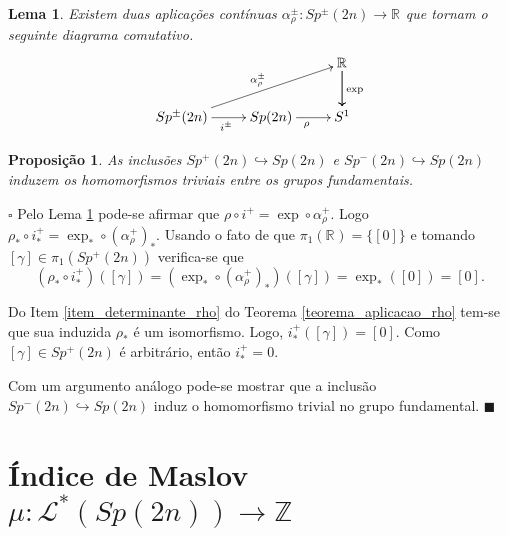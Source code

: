 \documentclass[12pt]{book}
\newtheorem{lema}[teorema]{Lema}
\newtheorem{proposicao}[teorema]{Proposição}
\newenvironment{prova}[1]{$\square$ #1}{\hfill$\blacksquare$}
\newcommand{\caminhos}{\mathcal{L}}
\newcommand{\classe}[1]{[#1]}
\newcommand{\dominioMaslov}{\caminhos^{*}(\gruposimpletico{2n})}
\newcommand{\grupofundamental}[1]{\pi_{1}(#1)}
\newcommand{\gruposimpletico}[1]{Sp(#1)}
\newcommand{\gruposimpleticonaodegenerado}[1]{Sp^{#1}(2n)}
\newcommand{\inteiros}{\mathbb{Z}}
\newcommand{\real}[1]{\mathbb{R}^{#1}}
\newcommand{\reta}{\real{}}
\begin{document}
	\begin{lema}\label{lema_levantamento_rho}
		Existem duas aplicações contínuas $\alpha^{\pm}_{\rho}: \gruposimpleticonaodegenerado{\pm}\to \reta$ que tornam o seguinte diagrama comutativo.
		$$
		\xymatrix{
			& & \real{}\ar[d]\ar[d]^{\text{exp}}
			\\
			\gruposimpleticonaodegenerado{\pm}\ar[urr]^{\alpha^{\pm}_{\rho}} \ar[r]_{i^{\pm}} & \gruposimpletico{2n} \ar[r]_{\rho} & S^{1}
		}
		$$	
		
	\end{lema}
	
	\begin{proposicao}\label{proposicao_homomorfismo_trivial_grupos_simpletico}
		As inclusões $\gruposimpleticonaodegenerado{+} \hookrightarrow \gruposimpletico{2n}$ e $\gruposimpleticonaodegenerado{-} \hookrightarrow \gruposimpletico{2n}$ induzem os homomorfismos triviais entre os grupos fundamentais.
	\end{proposicao}
	\begin{prova}
		Pelo Lema \ref{lema_levantamento_rho} pode-se afirmar que $\rho\circ i^{+} = \exp\circ \alpha^{+}_{\rho}$. Logo $\rho_{*}\circ i^{+}_{*} = \exp_{*}\circ (\alpha^{+}_{\rho})_{*}$. Usando o fato de que $\grupofundamental{\reta}=\{\classe{0}\}$ e tomando $\classe{\gamma}\in \grupofundamental{\gruposimpleticonaodegenerado{+}}$ verifica-se que 
		$$
		(\rho_{*}\circ i^{+}_{*})(\classe{\gamma}) = (\exp_{*}\circ (\alpha^{+}_{\rho})_{*})(\classe{\gamma}) = \exp_{*}(\classe{0})=\classe{0}.
		$$
		
		Do Item \ref{item_determinante_rho} do Teorema \ref{teorema_aplicacao_rho} tem-se que sua induzida $\rho_{*}$ é um isomorfismo. Logo, $	i^{+}_{*}(\classe{\gamma})=\classe{0}$. Como $\classe{\gamma}\in \gruposimpleticonaodegenerado{+}$ é arbitrário, então $i^{+}_{*} = 0$.
		
		Com um argumento análogo pode-se mostrar que a inclusão $\gruposimpleticonaodegenerado{-}\hookrightarrow \gruposimpletico{2n}$ induz o homomorfismo trivial no grupo fundamental.
	\end{prova}
		
	
	\section{Índice de Maslov $\mu : \dominioMaslov \to \inteiros$}\label{secao_indice_maslov}
	
\end{document}
